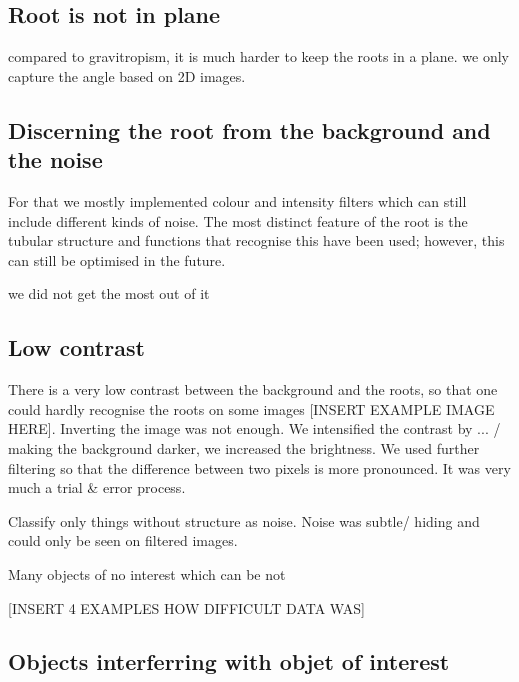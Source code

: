 \subsection{Root is not in plane}

compared to gravitropism, it is much harder to keep the roots in a plane. we only capture the angle based on 2D images.


\subsection{Discerning the root from the background and the noise}

For that we mostly implemented colour and intensity filters which can still include different kinds of noise. The most distinct feature of the root is the tubular structure and functions that recognise this have been used; however, this can still be optimised in the future.

we did not get the most out of it

\subsection{Low contrast}

There is a very low contrast between the background and the roots, so that one could hardly recognise the roots on some images [INSERT EXAMPLE IMAGE HERE].
Inverting the image was not enough. We intensified the contrast by ... / making the background darker, we increased the brightness. We used further filtering so that the difference between two pixels is more pronounced.
It was very much a trial \& error process.

Classify only things without structure as noise. 
Noise was subtle/ hiding and could only be seen on filtered images.

Many objects of no interest which can be not 


[INSERT 4 EXAMPLES HOW DIFFICULT DATA WAS]

\subsection{Objects interferring with objet of interest}

